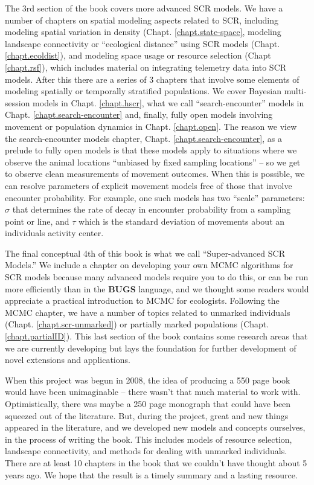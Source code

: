 The 3rd section of the book covers more advanced SCR models.  We have a
number of chapters on spatial modeling aspects related to SCR,
including modeling spatial variation in density
(Chapt. \ref{chapt.state-space}, modeling landscape connectivity or
``ecological distance'' using SCR models
(Chapt. \ref{chapt.ecoldist}), and modeling space usage or resource
selection (Chapt \ref{chapt.rsf}), which includes material on
integrating telemetry data into SCR models.  After this there are a
series of 3 chapters that involve some elements of modeling spatially
or temporally stratified populations.  We cover Bayesian multi-session
models in Chapt. \ref{chapt.hscr}, what we call
``search-encounter'' models in Chapt. \ref{chapt.search-encounter}
and, finally, fully open models involving movement or population
dynamics in Chapt. \ref{chapt.open}.  The reason we view the
search-encounter models chapter, Chapt. \ref{chapt.search-encounter},
as a prelude to fully open models is that these models apply to
situations where we observe the animal locations ``unbiased by fixed
sampling locations'' -- so we get to observe clean measurements of
movement outcomes. When this is possible, we can resolve parameters of
explicit movement models free of those that involve encounter
probability.  For example, one such models has two ``scale''
parameters: $\sigma$ that determines the rate of decay in encounter
probability from a sampling point or line, and $\tau$
which is
the standard deviation of movements about an individuals activity
center.

The final conceptual 4th of this book is what we call
``Super-advanced SCR Models.''
We include a
chapter on developing your own MCMC algorithms for SCR models because
many advanced models require you to do this, or can be run more efficiently than in the {\bf BUGS} language, and we thought some
readers would appreciate a practical introduction to MCMC for ecologists.
Following the MCMC chapter, we have a number
of topics related to unmarked individuals 
(Chapt. \ref{chapt.scr-unmarked}) or partially marked populations
(Chapt. \ref{chapt.partialID}). This last section of the book contains some research areas that we are
currently developing but lays the foundation for 
further development of novel extensions and applications.


When this project was begun in 2008, the idea of producing a 550 page
book would have been unimaginable -- there wasn't that much material
to work with.  Optimistically, there was maybe a 250 page monograph that
could have been squeezed out of the literature.  But, during the project,
great and new things appeared in the literature, and we developed new
models and concepts ourselves, in the process of writing the book. This includes models of resource selection,
landscape connectivity, and methods for dealing with unmarked
individuals. There are at least 10 chapters in the book that we
couldn't have thought about 5 years ago. We hope that the result is a
timely summary and a lasting resource.



